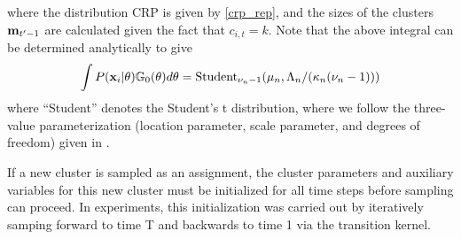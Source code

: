 \documentclass[twocolumn, final]{svjour3}
\begin{document}
where the distribution CRP is given by \eqref{crp_rep}, and the sizes of the clusters $\bold{m}_{t'-1}$ are calculated given the fact that $c_{i,t} = k$. Note that the above integral can be determined analytically to give
\begin{equation}
\label{marginal_obs_prob}
\int P(\bold{x}_{i} | \theta) \mathbb{G}_{0}(\theta)d\theta = \text{Student}_{\nu_{n} - 1}(\mu_{n}, \Lambda_{n}/(\kappa_{n}(\nu_{n}-1)))
\end{equation}
where ``Student'' denotes the Student's t distribution, where we follow the three-value parameterization (location parameter, scale parameter, and degrees of freedom) given in \cite{gelman2004bayesian}.



If a new cluster is sampled as an assignment, the cluster parameters and auxiliary variables for this new cluster must be initialized for all time steps before sampling can proceed. In experiments, this initialization was carried out by iteratively samping forward to time T and backwards to time 1 via the transition kernel.





\end{document}

